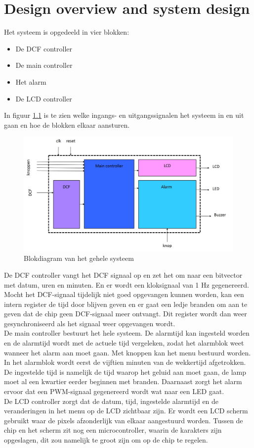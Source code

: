 
\chapter{Design overview and system design}
Het systeem is opgedeeld in vier blokken:
\begin{itemize}
\item De DCF controller
\item De main controller
\item Het alarm
\item De LCD controller
\end{itemize}

\noindent In figuur \ref{fig:blokdiagram} is te zien welke ingangs- en uitgangssignalen het systeem in en uit gaan en hoe de blokken elkaar aansturen.

\begin{figure}[h!]
\center
\includegraphics[width=15cm]{figure/blokdiagram}
\caption{Blokdiagram van het gehele systeem}
\label{fig:blokdiagram}
\end{figure}

\noindent De DCF controller vangt het DCF signaal op en zet het om naar een bitvector met datum, uren en minuten. En er wordt een kloksignaal van 1 Hz gegenereerd. Mocht het DCF-signaal tijdelijk niet goed opgevangen kunnen worden, kan een intern register de tijd door blijven geven en er gaat een ledje branden om aan te geven dat de chip geen DCF-signaal meer ontvangt. Dit register wordt dan weer gesynchroniseerd als het signaal weer opgevangen wordt.\\
De main controller bestuurt het hele systeem. De alarmtijd kan ingesteld worden en de alarmtijd wordt met de actuele tijd vergeleken, zodat het alarmblok weet wanneer het alarm aan moet gaan. Met knoppen kan het menu bestuurd worden.\\
In het alarmblok wordt eerst de vijftien minuten van de wekkertijd afgetrokken. De ingestelde tijd is namelijk de tijd waarop het geluid aan moet gaan, de lamp moet al een kwartier eerder beginnen met branden. Daarnaast zorgt het alarm ervoor dat een PWM-signaal gegenereerd wordt wat naar een LED gaat. \\
De LCD controller zorgt dat de datum, tijd, ingestelde alarmtijd en de veranderingen in het menu op de LCD zichtbaar zijn. Er wordt een LCD scherm gebruikt waar de pixels afzonderlijk van elkaar aangestuurd worden. Tussen de chip en het scherm zit nog een microcontroller, waarin de karakters zijn opgeslagen, dit zou namelijk te groot zijn om op de chip te regelen.
